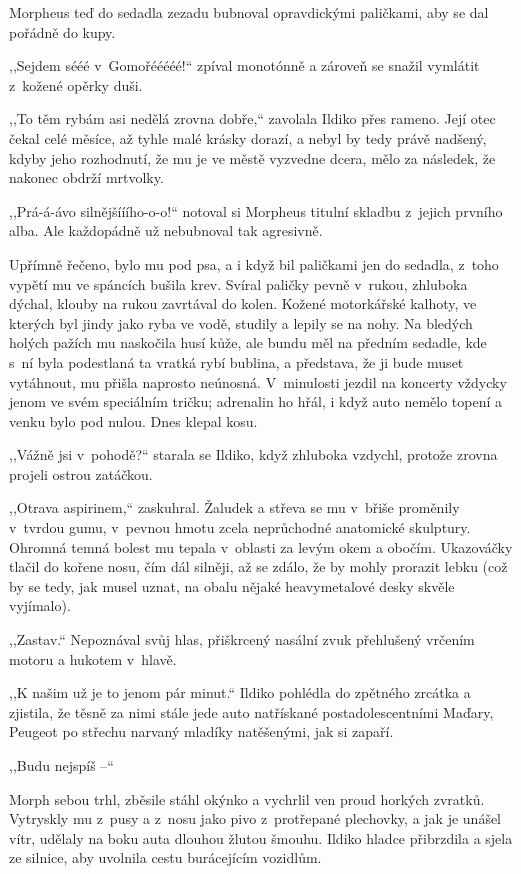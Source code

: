 Morpheus teď do sedadla zezadu bubnoval opravdickými paličkami, aby se dal pořádně do kupy.

,,Sejdem sééé v Gomořééééé!`` zpíval monotónně a zároveň se snažil vymlátit z kožené opěrky duši.

,,To těm rybám asi nedělá zrovna dobře,`` zavolala Ildiko přes rameno. Její otec čekal celé měsíce, až tyhle malé krásky dorazí, a nebyl by tedy právě nadšený, kdyby jeho rozhodnutí, že mu je ve městě vyzvedne dcera, mělo za následek, že nakonec obdrží mrtvolky.

,,Prá-á-ávo silnějšííího-o-o!`` notoval si Morpheus titulní skladbu z jejich prvního alba. Ale každopádně už nebubnoval tak agresivně.

Upřímně řečeno, bylo mu pod psa, a i když bil paličkami jen do sedadla, z toho vypětí mu ve spáncích bušila krev. Svíral paličky pevně v rukou, zhluboka dýchal, klouby na rukou zavrtával do kolen. Kožené motorkářské kalhoty, ve kterých byl jindy jako ryba ve vodě, studily a lepily se na nohy. Na bledých holých pažích mu naskočila husí kůže, ale bundu měl na předním sedadle, kde s ní byla podestlaná ta vratká rybí bublina, a představa, že ji bude muset vytáhnout, mu přišla naprosto neúnosná. V minulosti jezdil na koncerty vždycky jenom ve svém speciálním tričku; adrenalin ho hřál, i když auto nemělo topení a venku bylo pod nulou. Dnes klepal kosu.

,,Vážně jsi v pohodě?`` starala se Ildiko, když zhluboka vzdychl, protože zrovna projeli ostrou zatáčkou.

,,Otrava aspirinem,`` zaskuhral. Žaludek a střeva se mu v břiše proměnily v tvrdou gumu, v pevnou hmotu zcela neprůchodné anatomické skulptury. Ohromná temná bolest mu tepala v oblasti za levým okem a obočím. Ukazováčky tlačil do kořene nosu, čím dál silněji, až se zdálo, že by mohly prorazit lebku (což by se tedy, jak musel uznat, na obalu nějaké heavymetalové desky skvěle vyjímalo).

,,Zastav.`` Nepoznával svůj hlas, přiškrcený nasální zvuk přehlušený vrčením motoru a hukotem v hlavě.

,,K našim už je to jenom pár minut.`` Ildiko pohlédla do zpětného zrcátka a zjistila, že těsně za nimi stále jede auto natřískané postadolescentními Maďary, Peugeot po střechu narvaný mladíky natěšenými, jak si zapaří.

,,Budu nejspíš --``

Morph sebou trhl, zběsile stáhl okýnko a vychrlil ven proud horkých zvratků. Vytryskly mu z pusy a z nosu jako pivo z protřepané plechovky, a jak je unášel vítr, udělaly na boku auta dlouhou žlutou šmouhu. Ildiko hladce přibrzdila a sjela ze silnice, aby uvolnila cestu burácejícím vozidlům.


